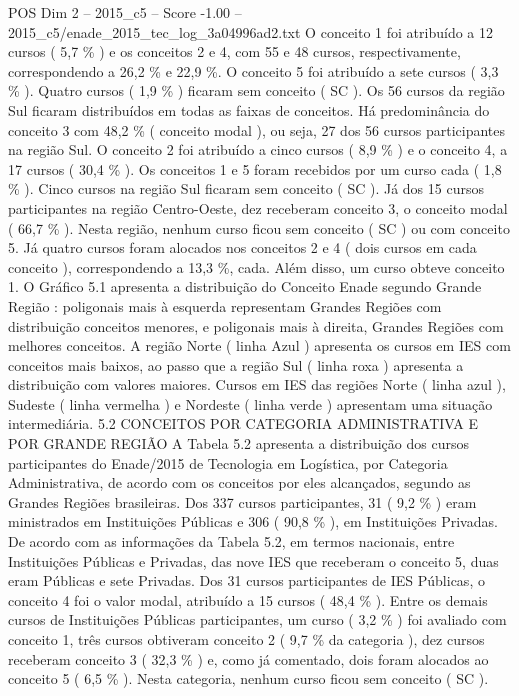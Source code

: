 \begin{textsample}{POS Dim 2 – 2015\_c5 – Score -1.00 – 2015\_c5/enade\_2015\_tec\_log\_3a04996ad2.txt}
O conceito 1 foi atribuído a 12 cursos ( 5,7 \% ) e os conceitos 2 e 4, com 55 e 48 cursos, respectivamente, correspondendo a 26,2 \% e 22,9 \%.
O conceito 5 foi atribuído a sete cursos ( 3,3 \% ).
Quatro cursos ( 1,9 \% ) ficaram sem conceito ( SC ).
Os 56 cursos da região Sul ficaram distribuídos em todas as faixas de conceitos.
Há predominância do conceito 3 com 48,2 \% ( conceito modal ), ou seja, 27 dos 56 cursos participantes na região Sul.
O conceito 2 foi atribuído a cinco cursos ( 8,9 \% ) e o conceito 4, a 17 cursos ( 30,4 \% ).
Os conceitos 1 e 5 foram recebidos por um curso cada ( 1,8 \% ).
Cinco cursos na região Sul ficaram sem conceito ( SC ).
Já dos 15 cursos participantes na região Centro-Oeste, dez receberam conceito 3, o conceito modal ( 66,7 \% ).
Nesta região, nenhum curso ficou sem conceito ( SC ) ou com conceito 5.
Já quatro cursos foram alocados nos conceitos 2 e 4 ( dois cursos em cada conceito ), correspondendo a 13,3 \%, cada.
Além disso, um curso obteve conceito 1.
O Gráfico 5.1 apresenta a distribuição do Conceito Enade segundo Grande Região : poligonais mais à esquerda representam Grandes Regiões com distribuição conceitos menores, e poligonais mais à direita, Grandes Regiões com melhores conceitos.
A região Norte ( linha Azul ) apresenta os cursos em IES com conceitos mais baixos, ao passo que a região Sul ( linha roxa ) apresenta a distribuição com valores maiores.
Cursos em IES das regiões Norte ( linha azul ), Sudeste ( linha vermelha ) e Nordeste ( linha verde ) apresentam uma situação intermediária. 5.2 CONCEITOS POR CATEGORIA ADMINISTRATIVA E POR GRANDE REGIÃO A Tabela 5.2 apresenta a distribuição dos cursos participantes do Enade/2015 de Tecnologia em Logística, por Categoria Administrativa, de acordo com os conceitos por eles alcançados, segundo as Grandes Regiões brasileiras.
Dos 337 cursos participantes, 31 ( 9,2 \% ) eram ministrados em Instituições Públicas e 306 ( 90,8 \% ), em Instituições Privadas.
De acordo com as informações da Tabela 5.2, em termos nacionais, entre Instituições Públicas e Privadas, das nove IES que receberam o conceito 5, duas eram Públicas e sete Privadas.
Dos 31 cursos participantes de IES Públicas, o conceito 4 foi o valor modal, atribuído a 15 cursos ( 48,4 \% ).
Entre os demais cursos de Instituições Públicas participantes, um curso ( 3,2 \% ) foi avaliado com conceito 1, três cursos obtiveram conceito 2 ( 9,7 \% da categoria ), dez cursos receberam conceito 3 ( 32,3 \% ) e, como já comentado, dois foram alocados ao conceito 5 ( 6,5 \% ).
Nesta categoria, nenhum curso ficou sem conceito ( SC ).

\end{textsample}
